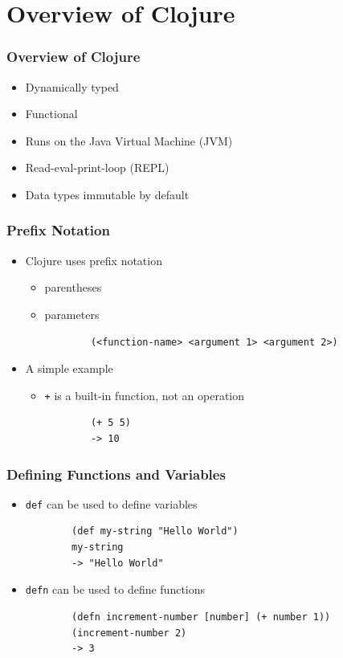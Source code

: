 \documentclass{beamer}
\begin{document}
\section{Overview of Clojure}

\begin{frame}
\frametitle{Overview of Clojure}
	\begin{itemize}
  	 \item Dynamically typed
  	 \item Functional

  	 \item Runs on the Java Virtual Machine (JVM)
  	 \item Read-eval-print-loop (REPL)
  	 \item Data types immutable by default
	 \end{itemize}
\end{frame}

\begin{frame}[fragile]
\frametitle{Prefix Notation}
	\begin{itemize}
  	 \item Clojure uses prefix notation
  	 \begin{itemize}
  	 	\item parentheses
  	 	\item parameters
  	 \begin{verbatim}
		(<function-name> <argument 1> <argument 2>)
	 \end{verbatim}
	 \end{itemize}
	\end{itemize}
	\begin{itemize}
  	 	\item A simple example
  	 	\begin{itemize}
  	 	 \item \texttt{+} is a built-in function, not an operation
  	 	\begin{verbatim}		
		(+ 5 5)
		-> 10
	    \end{verbatim}
	    \end{itemize}
  	 \end{itemize}
\end{frame}

\begin{frame}[fragile]
\frametitle{Defining Functions and Variables}
	\begin{itemize}
  	 \item \texttt{def} can be used to define variables
  	 \begin{verbatim}
		(def my-string "Hello World")
		my-string
		-> "Hello World"
	\end{verbatim}
	\end{itemize}
	\begin{itemize}
  	 \item \texttt{defn} can be used to define functions
  	 \begin{verbatim}
		(defn increment-number [number] (+ number 1))
		(increment-number 2)
		-> 3
	\end{verbatim}
	\end{itemize}
\end{frame}
\end{document}
